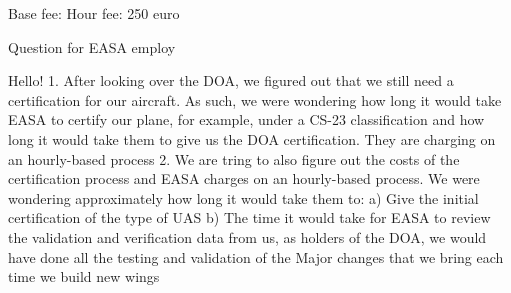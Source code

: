 Base fee: 
Hour fee: 250 euro


Question for EASA employ

Hello!
1. After looking over the DOA, we figured out that we still need a certification for our aircraft. As such, we were wondering how long it would take EASA to certify our plane, for example, under a CS-23 classification and how long it would take them to give us the DOA certification. They are charging on an hourly-based process
2. We are tring to also figure out the costs of the certification process and EASA charges on an hourly-based process. We were wondering approximately how long it would take them to: 
    a) Give the initial certification of the type of UAS
    b) The time it would take for EASA to review the validation and verification data from us, as holders of the DOA, we would have done all the testing and validation of the Major changes that we bring each time we build new wings  